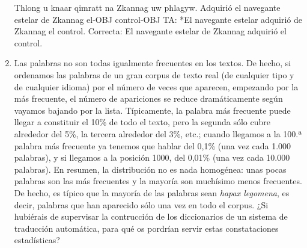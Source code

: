 \begin{enumerate}
\begin{example}
\end{example} \begin{example} \gll Thlong u knaar qimratt na Zkannag uw phlagyw. {Adquirió} el navegante estelar de Zkannag el-OBJ control-OBJ \glt TA: *El navegante estelar adquirió de Zkannag el control. \glt Correcta: El navegante estelar de Zkannag adquirió el control. \glend

\end{example} 

\item Las palabras no son todas igualmente frecuentes en los textos. De hecho, si ordenamos las palabras de un gran corpus de texto real (de cualquier tipo y de cualquier idioma) por el número de veces que aparecen, empezando por la más frecuente, el número de apariciones se reduce dramáticamente según vayamos bajando por la lista. Típicamente, la palabra más frecuente puede llegar a constituir el 10\% de todo el texto, pero la segunda sólo cubre alrededor del 5\%, la tercera alrededor del 3\%, etc.; cuando llegamos a la 100.ª palabra más frecuente ya tenemos que hablar del 0,1\% (una vez cada 1.000 palabras), y si llegamos a la posición 1000, del 0,01\% (una vez cada 10.000 palabras). En resumen, la distribución no es nada homogénea: unas pocas palabras son las más frecuentes y la mayoría son muchísimo menos frecuentes. De hecho, es típico que la mayoría de las palabras sean \emph{hapax legomena}, es decir, palabras que han aparecido sólo una vez en todo el corpus. ¿Si hubiérais de supervisar la contrucción de los diccionarios de un sistema de traducción automática, para qué os pordrían servir estas constataciones estadísticas? 


\end{enumerate}
